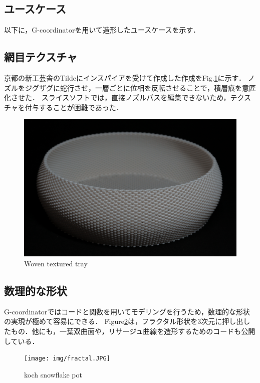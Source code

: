 \documentclass{article}
\begin{document}
\begin{twocolumn}
\begin{itemize}
\section{ユースケース}
以下に，G-coordinatorを用いて造形したユースケースを示す．

\subsection{網目テクスチャ}

京都の新工芸舎\cite{shinkogeisha}のTilde\cite{tildeprinted}にインスパイアを受けて作成した作成をFig.\ref{fig:WaveTray}に示す．
ノズルをジグザグに蛇行させ，一層ごとに位相を反転させることで，積層痕を意匠化させた．
スライスソフトでは，直接ノズルパスを編集できないため，テクスチャを付与することが困難であった．

\begin{figure}[htbp]
  \includegraphics[width=\linewidth]{img/wave_tray.JPG}
  \caption{Woven textured tray}
  \label{fig:WaveTray}
\end{figure}

\subsection{数理的な形状}\label{sec:mathmaticalShape}
G-coordinatorではコードと関数を用いてモデリングを行うため，数理的な形状の実現が極めて容易にできる．
Figure\ref{fig:fractal}は，フラクタル形状を3次元に押し出したもの．他にも，一葉双曲面や，リサージュ曲線を造形するためのコードも公開している．

\begin{figure}[htbp]
  \texttt{[image: img/fractal.JPG]}
  \caption{koch snowflake pot}
  \label{fig:fractal}
\end{figure}


\end{itemize}
\end{twocolumn}
\end{document}
